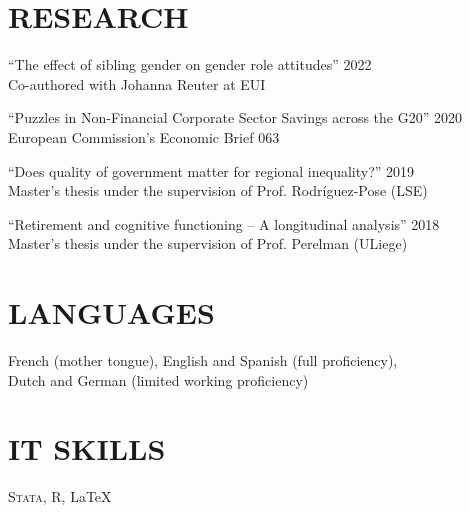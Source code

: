 \documentclass[margin,a4paper]{res}
\begin{document}
\begin{resume}
             


\section{RESEARCH}

	``The effect of sibling gender on gender role attitudes'' \hfill 2022 \\
		Co-authored with Johanna Reuter at EUI

		``Puzzles in Non-Financial Corporate Sector Savings across the G20'' \hfill  2020 \\
		European Commission's Economic Brief 063

 
		``Does quality of government matter for regional inequality?''	 \hfill	 2019 \\
		Master's thesis under the supervision of Prof. Rodríguez-Pose (LSE) 
		
		
		

		``Retirement and cognitive functioning -- A longitudinal analysis''	 \hfill	 2018 \\
		Master's thesis under the supervision of Prof. Perelman (ULiege)


 
 
\section{LANGUAGES} French (mother tongue), English and Spanish (full proficiency),\\ Dutch and German (limited working proficiency)
                

 \section{IT SKILLS} \textsc{Stata}, \textsf{R}, \LaTeX




\end{resume}
\end{document}
